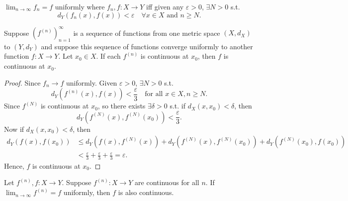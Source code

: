 \begin{prev}
    \(\lim_{n \to \infty} f_n = f \) uniformly where \(f_n, f:X \to Y\) iff given any \(\varepsilon > 0\), \(\exists N > 0\) s.t. 
    \[
        d_Y \left( f_n(x), f(x) \right) < \varepsilon \quad \forall x \in X \text{ and } n \ge N. 
    \]    
\end{prev}

\begin{theorem}[考試會考] \label{thm: uniformly convergence preserves continuity at limit}
    Suppose \(\left( f^{(n)} \right)_{n=1}^{\infty}  \) is a sequence of functions from one metric space \((X, d_X)\) to \((Y, d_Y)\) and suppose this sequence of functions converge uniformly to another function \(f:X \to Y\). Let \(x_0 \in X\). If each \(f^{(n)}\) is continuous at \(x_0\), then \(f\) is continuous at \(x_0\).        
\end{theorem}

\begin{proof}
    Since \(f_n \to f\) uniformly. Given \(\varepsilon > 0\), \(\exists N > 0\) s.t. 
    \[
        d_Y \left( f^{(n)}(x), f(x) \right) < \frac{\varepsilon}{3} \quad \text{for all } x \in X, n \ge N. 
    \]   
    Since \(f^{(N)}\) is continuous at \(x_0\), so there exists \(\exists \delta > 0\) s.t. if \(d_X(x, x_0) < \delta \), then 
    \[
        d_Y \left( f^{(N)}(x), f^{(N)}(x_0) \right) < \frac{\varepsilon}{3}.
    \] 
    Now if \(d_X(x, x_0) < \delta \), then 
    \begin{align*}
        d_Y ( f(x), f(x_0)) &\le d_Y \left( f(x), f^{(N)}(x) \right) + d_Y \left( f^{(N)}(x), f^{(N)}(x_0) \right) + d_Y \left( f^{(N)}(x_0), f(x_0) \right) \\
        &< \frac{\varepsilon}{3} + \frac{\varepsilon}{3} + \frac{\varepsilon}{3} = \varepsilon. 
    \end{align*} 
    Hence, \(f\) is continuous at \(x_0\).   
\end{proof}

\begin{corollary} \label{cl: uniformly continuous preserve continuity}
    Let \(f^{(n)}, f:X \to Y\). Suppose \(f^{(n)}:X \to Y\) are continuous for all \(n\). If \(\lim_{n \to \infty} f^{(n)} = f \) uniformly, then \(f\) is also continuous.     
\end{corollary}

